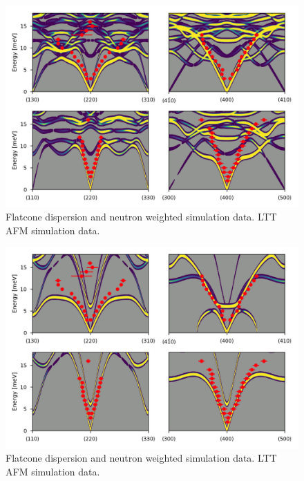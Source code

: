 \begin{figure}[]
    \centering
    \includegraphics[width=\textwidth]{fig/lowen/flatcone_fits_simulation_ltt_afm.png}
    \caption[Flatcone dispersion and neutron weighted simulation data]{Flatcone dispersion and neutron weighted simulation data. LTT AFM simulation data.}
\end{figure}

\begin{figure}[]
    \centering
    \includegraphics[width=\textwidth]{fig/lowen/flatcone_fits_simulation_htt_metal.png}
    \caption[Flatcone dispersion and neutron weighted simulation data]{Flatcone dispersion and neutron weighted simulation data. LTT AFM simulation data.}
\end{figure}

